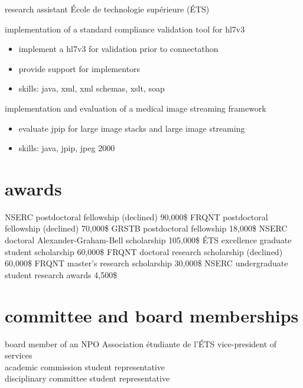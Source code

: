 \documentclass[print]{friggeri-cv}
\begin{document}
\begin{entrylist}
  {research assistant}
  {École de technologie supérieure {\scriptsize (ÉTS)}}
  {implementation of a standard compliance validation tool for hl{\small7}v{\small3}
  \begin{itemize}
    \item implement a hl{\small7}v{\small3} for validation prior to connectathon
    \item provide support for implementors
  \item skills: java, xml, xml schemas, xslt, soap
  \end{itemize}
  implementation and evaluation of a medical image streaming framework
  \begin{itemize}
    \item evaluate jpip for large image stacks and large image streaming
    \item skills: java, jpip, jpeg 2000
  \end{itemize}
  }
\end{entrylist}

\section{awards}
\begin{entrylist}
   {{\small NSERC} postdoctoral fellowship (declined)} {90,000\$} {\vspace{-3mm}}
   {{\small FRQNT} postdoctoral fellowship (declined)} {70,000\$} {\vspace{-3mm}}
   {{\small GRSTB} postdoctoral fellowship} {18,000\$} {\vspace{-3mm}}
   {{\small NSERC} doctoral Alexander-Graham-Bell scholarship} {105,000\$} {\vspace{-3mm}}
   {{\small ÉTS} excellence graduate student scholarship} {60,000\$} {\vspace{-3mm}}
   {{\small FRQNT} doctoral research scholarship (declined)} {60,000\$} {\vspace{-3mm}}
   {{\small FRQNT} master's research scholarship} {30,000\$} {\vspace{-3mm}}
   {{\small NSERC} undergraduate student research awards} {4,500\$} {\vspace{-3mm}}
 \end{entrylist}
\vspace{2mm}

\section{committee and board memberships}
\begin{entrylist}
  {board member of an {\small NPO}} {Association étudiante de l'{\scriptsize ÉTS}} {vice-president of services\\ academic commission student representative \\ disciplinary committee student representative}
\end{entrylist}
\end{document}

